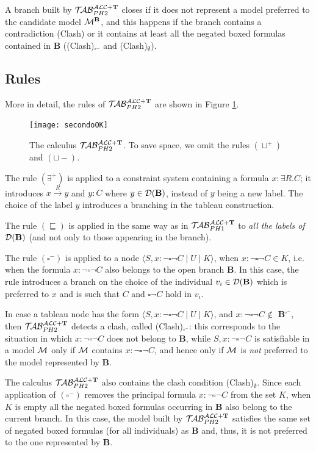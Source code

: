 \documentclass[a4paper, 11pt, oneside]{duthesis}
\newcommand{\tip}{{\bf T}}
\newcommand{\hide}[1]{}
\newcommand{\vuoto} {\emptyset}
\newcommand{\nott} {\lnot}
\newcommand{\tc} {\mid}
\newcommand{\bbox}{\square}
\newcommand{\sx} {\langle}
\newcommand{\dx} {\rangle}
\newcommand{\esiste} {\exists}
\newcommand{\db}{\mathcal{D}(\mbox{\bf B})}
\newcommand{\emme} {\begin{mathcal}M\end{mathcal}}
\newcommand{\primo}{\mathrel{{\mathcal{T}\!\mathcal{AB}}}_{PH 1}^{\mathcal{ALC}+\mbox{\scriptsize $\tip$}}}
\newcommand{\secondo}{\mathrel{{\mathcal{T}\!\mathcal{AB}}}_{PH 2}^{\mathcal{ALC}+\mbox{\scriptsize $\tip$}}}
\newcommand{\trans}[1]{\stackrel{#1}{\longrightarrow}}
\begin{document}
A branch built by $\secondo$ closes if it does not represent a model preferred to the candidate model $\emme^{\bf B}$, and this happens if the branch contains a contradiction (Clash) or it contains at least all the negated boxed formulas contained in {\bf B} ((Clash)$_{\bbox^{-}}$ and (Clash)$_{\vuoto}$).

\newpage

\subsection{Rules}

More in detail, the rules of\hide{the calculus} $\secondo$ are shown in Figure \ref{immagine secondo}.

\begin{figure}[H]
{\centerline{
\texttt{[image: secondoOK]}} }
\caption{The calculus $\secondo$. To save space, we omit the rules $(\sqcup^+)$ and $(\sqcup-)$.}\label{immagine secondo}
\end{figure}

The rule $(\esiste^+)$ is applied to a constraint system containing a formula $x: \esiste R.C$; it introduces $x \trans{R} y$ and $y: C$ where $y \in \db$, instead of $y$ being a new label.
The choice of the label $y$ introduces a branching in the tableau construction.

The rule $(\sqsubseteq)$ is applied in the same way as in $\primo$ to \emph{all the labels of} $\db$ (and not only to those appearing in the branch).

The rule $(\bbox^{-})$ is applied to a node $\sx S, x: \nott \bbox \nott C \tc U \tc K \dx$, when $x: \nott \bbox \nott C\in K$, i.e. when the formula $x: \nott \bbox \nott C$ also belongs to the open branch {\bf B}. In this case, the rule introduces a branch on the choice of the individual $v_i \in \db$ which is preferred to $x$ and is such that $C$ and $\bbox \nott C$ hold in $v_i$.

In case a tableau node has the form $\sx S, x: \nott \bbox \nott C \tc U \tc K \dx$, and $x: \nott \bbox \nott C \not\in$ {\bf B}$^{\bbox^{-}}$, then $\secondo$ detects a clash, called (Clash)$_{\bbox^{-}}$: this corresponds to the situation in which $x: \nott \bbox \nott C$ does not belong to {\bf B}, while $S, x: \nott \bbox \nott C$ is satisfiable in a model $\emme$ only if $\emme$ contains $x: \nott \bbox \nott C$, and hence only if $\emme$ is \emph{not} preferred to the model represented by {\bf B}.

The calculus $\secondo$ also contains the clash condition (Clash)$_{\vuoto}$. Since each application of $(\bbox^{-})$ removes the principal formula $x: \nott \bbox \nott C$ from the set $K$, when $K$ is empty all the negated boxed formulas occurring in {\bf B} also belong to the current branch.
In this case, the model built by $\secondo$ satisfies the same set of negated boxed formulas (for all individuals) as {\bf B} and, thus, it is not preferred to the one represented by {\bf B}.\\
\end{document}
